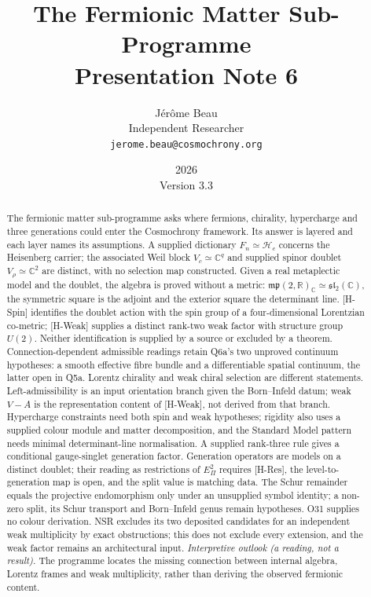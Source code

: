 \documentclass[11pt,a4paper]{article}
\title{The Fermionic Matter Sub-Programme\\[0.4em]
\large Presentation Note 6}
\author{J\'{e}r\^{o}me Beau\\[0.3em]
\small Independent Researcher\\
\small \texttt{jerome.beau@cosmochrony.org}}
\date{2026\\[2pt]\small Version 3.3}
\theoremstyle{definition}
\begin{document}
  \maketitle

  \begin{abstract}
    The fermionic matter sub-programme asks where fermions, chirality, hypercharge and three generations
    could enter the Cosmochrony framework.
    Its answer is layered and each layer names its assumptions.
    A supplied dictionary $F_n\simeq\mathcal{H}_c$ concerns the Heisenberg carrier;
    the associated Weil block $V_c\simeq\mathbb{C}^q$ and supplied spinor doublet
    $V_\rho\simeq\mathbb{C}^2$ are distinct, with no selection map constructed.
    Given a real metaplectic model and the doublet, the algebra is proved without a metric:
    $\mathfrak{mp}(2,\mathbb{R})_\mathbb{C}\simeq\mathfrak{sl}_2(\mathbb{C})$,
    the symmetric square is the adjoint and the exterior square the determinant line.
    [H-Spin] identifies the doublet action with the spin group of a four-dimensional Lorentzian co-metric;
    [H-Weak] supplies a distinct rank-two weak factor with structure group $U(2)$.
    Neither identification is supplied by a source or excluded by a theorem.
    Connection-dependent admissible readings retain Q6a's two unproved continuum hypotheses:
    a smooth effective fibre bundle and a differentiable spatial continuum, the latter open in Q5a.
    Lorentz chirality and weak chiral selection are different statements.
    Left-admissibility is an input orientation branch given the Born--Infeld datum;
    weak $V{-}A$ is the representation content of [H-Weak], not derived from that branch.
    Hypercharge constraints need both spin and weak hypotheses; rigidity also uses a supplied colour module
    and matter decomposition, and the Standard Model pattern needs minimal determinant-line normalisation.
    A supplied rank-three rule gives a conditional gauge-singlet generation factor.
    Generation operators are models on a distinct doublet; their reading as restrictions of $E_\Pi^2$
    requires [H-Res], the level-to-generation map is open, and the split value is matching data.
    The Schur remainder equals the projective endomorphism only under an unsupplied symbol identity;
    a non-zero split, its Schur transport and Born--Infeld genus remain hypotheses.
    O31 supplies no colour derivation.
    NSR excludes its two deposited candidates for an independent weak multiplicity by exact obstructions;
    this does not exclude every extension, and the weak factor remains an architectural input.
    \emph{Interpretive outlook (a reading, not a result).}
    The programme locates the missing connection between internal algebra, Lorentz frames and weak
    multiplicity, rather than deriving the observed fermionic content.
  \end{abstract}
\end{document}
